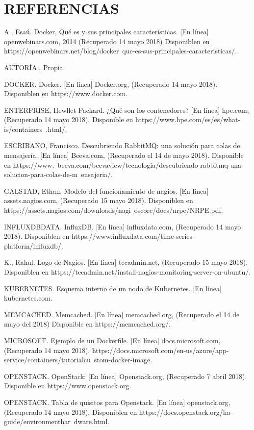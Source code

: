     \newpage\chapter{REFERENCIAS}
    
    A., Esaú. Docker, Qué es y sus principales características. [En línea] openwebinars.com, 2014 (Recuperado 14 mayo 2018) Disponiblen en https://openwebinars.net/blog/docker\ que-es-sus-principales-caracteristicas/.
    
 AUTORÍA., Propia. 
 
DOCKER. Docker. [En línea] Docker.org, (Recuperado 14 mayo 2018). Disponiblen en https://www.docker.com. 

ENTERPRISE, Hewllet Packard. ¿Qué son los contenedores? [En línea] hpe.com, (Recuperado 14 mayo 2018). Disponible en https://www.hpe.com/es/es/what-is/containers\ .html/. 

ESCRIBANO, Francisco. Descubriendo RabbitMQ: una solución para colas de mensajería. [En línea] Beeva.com, (Recuperado el 14 de mayo 2018). Disponible en https://www.\ beeva.com/beevaview/tecnologia/descubriendo-rabbitmq-una-solucion-para-colas-de-m\ ensajeria/. 

GALSTAD, Ethan. Modelo del funcionamiento de nagios. [En línea] assets.nagios.com, (Recuperado 15 mayo 2018). Disponiblen en https://assets.nagios.com/downloads/nagi\ oscore/docs/nrpe/NRPE.pdf. 

INFLUXDBDATA. InfluxDB. [En línea] influxdata.com, (Recuperado 14 mayo 2018). Disponiblen en https://www.influxdata.com/time-series-platform/influxdb/.

 K., Rahul. Logo de Nagios. [En línea] tecadmin.net, (Recuperado 15 mayo 2018). Disponiblen en https://tecadmin.net/install-nagios-monitoring-server-on-ubuntu/. 
 
 KUBERNETES. Esquema interno de un nodo de Kubernetes. [En línea] kubernetes.com. 
 
MEMCACHED. Memcached. [En línea] memcached.org, (Recuperado el 14 de mayo del 2018) Disponible en https://memcached.org/. 

MICROSOFT. Ejemplo de un Dockerfile. [En línea] docs.microsoft.com, (Recuperado 14 mayo 2018). https://docs.microsoft.com/en-us/azure/app-service/containers/tutorialcu\ stom-docker-image. 

OPENSTACK. OpenStack: [En línea] Openstack.org, (Recuperado 7 abril 2018). Disponible en https://www.openstack.org. 

OPENSTACK. Tabla de quisitos para Openstack. [En línea] openstack.org, (Recuperado 14 mayo 2018). Disponiblen en https://docs.openstack.org/ha-guide/environmenthar\ dware.html. 

